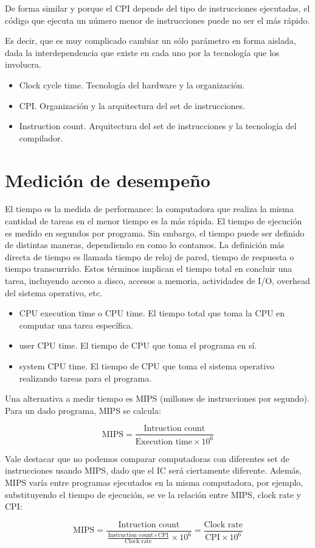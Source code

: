 De forma similar y porque el CPI depende del tipo de instrucciones ejecutadas, el código que ejecuta un número menor de instrucciones puede no ser el más rápido.

Es decir, que es muy complicado cambiar un sólo parámetro en forma aislada, dada la interdependencia que existe en cada uno por la tecnología que los involucra.

\begin{itemize}
\item Clock cycle time. Tecnología del hardware y la organización.
\item CPI. Organización y la arquitectura del set de instrucciones.
\item Instruction count. Arquitectura del set de instrucciones y la tecnología del compilador.
\end{itemize}


\section{Medición de desempeño}
El tiempo es la medida de performance: la computadora que realiza la misma cantidad de tareas en el menor tiempo es la más rápida. El tiempo de ejecución es medido en segundos por programa. Sin embargo, el tiempo puede ser definido de distintas maneras, dependiendo en como lo contamos. La definición más directa de tiempo es llamada tiempo de reloj de pared, tiempo de respuesta o tiempo transcurrido. Estos términos implican el tiempo total en concluir una tarea, incluyendo acceso a disco, accesos a memoria, actividades de I/O, overhead del sistema operativo, etc.


\begin{itemize}
\item CPU execution time o CPU time. El tiempo total que toma la CPU en computar una tarea específica.
\item user CPU time. El tiempo de CPU que toma el programa en sí.
\item system CPU time. El tiempo de CPU que toma el sistema operativo realizando tareas para el programa.
\end{itemize}

Una alternativa a medir tiempo es MIPS (millones de instrucciones por segundo). Para un dado programa, MIPS se calcula:

\[ \text{MIPS} = \frac{\text{Intruction count}}{\text{Execution time} \times 10^6} \]  

Vale destacar que no podemos comparar computadoras con diferentes set de instrucciones usando MIPS, dado que el IC será ciertamente diferente. Además, MIPS varía entre programas ejecutados en la misma computadora, por ejemplo, substituyendo el tiempo de ejecución, se ve la relación entre MIPS, clock rate y CPI:

\[ \text{MIPS} = \frac{\text{Intruction count}}{\frac{\text{Instruction count} \times \text{CPI}}{\text{Clock rate}} \times 10^6} = \frac{\text{Clock rate}}{\text{CPI} \times 10^6} \]

